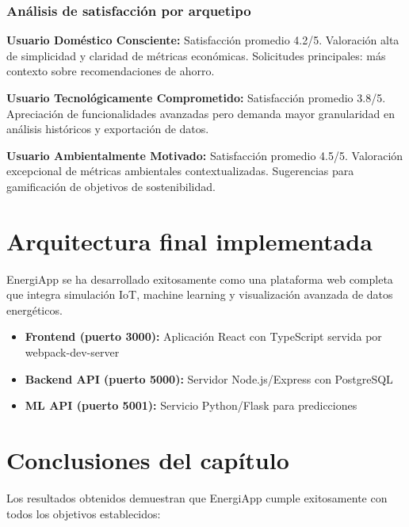 \subsubsection{Análisis de satisfacción por arquetipo}

\textbf{Usuario Doméstico Consciente:} Satisfacción promedio 4.2/5. Valoración alta de simplicidad y claridad de métricas económicas. Solicitudes principales: más contexto sobre recomendaciones de ahorro.

\textbf{Usuario Tecnológicamente Comprometido:} Satisfacción promedio 3.8/5. Apreciación de funcionalidades avanzadas pero demanda mayor granularidad en análisis históricos y exportación de datos.

\textbf{Usuario Ambientalmente Motivado:} Satisfacción promedio 4.5/5. Valoración excepcional de métricas ambientales contextualizadas. Sugerencias para gamificación de objetivos de sostenibilidad.

\section{Arquitectura final implementada}

EnergiApp se ha desarrollado exitosamente como una plataforma web completa que integra simulación IoT, machine learning y visualización avanzada de datos energéticos.

\begin{itemize}
    \item \textbf{Frontend (puerto 3000):} Aplicación React con TypeScript servida por webpack-dev-server
    \item \textbf{Backend API (puerto 5000):} Servidor Node.js/Express con PostgreSQL
    \item \textbf{ML API (puerto 5001):} Servicio Python/Flask para predicciones
\end{itemize}

\section{Conclusiones del capítulo}

Los resultados obtenidos demuestran que EnergiApp cumple exitosamente con todos los objetivos establecidos:

